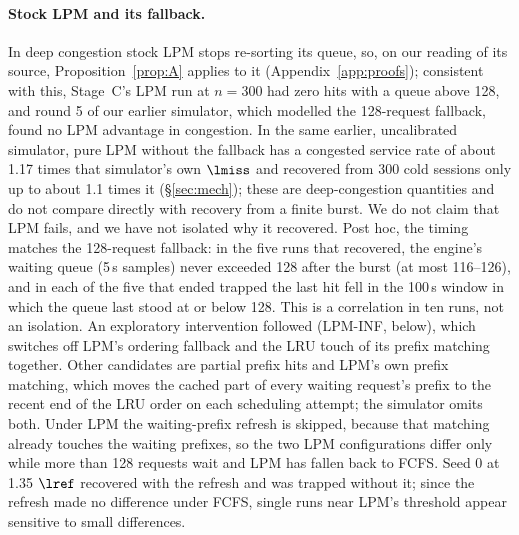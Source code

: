 \paragraph{Stock LPM and its fallback.} In deep congestion stock LPM stops re-sorting its queue, so, on our reading of its source, Proposition~\ref{prop:A} applies to it (Appendix~\ref{app:proofs}); consistent with this, Stage~C's LPM run at $n=300$ had zero hits with a queue above 128, and round 5 of our earlier simulator, which modelled the 128-request fallback, found no LPM advantage in congestion. In the same earlier, uncalibrated simulator, pure LPM without the fallback has a congested service rate of about 1.17 times that simulator's own $\lmiss$ and recovered from 300 cold sessions only up to about 1.1 times it (\S\ref{sec:mech}); these are deep-congestion quantities and do not compare directly with recovery from a finite burst. We do not claim that LPM fails, and we have not isolated why it recovered. Post hoc, the timing matches the 128-request fallback: in the five runs that recovered, the engine's waiting queue (5\,s samples) never exceeded 128 after the burst (at most 116--126), and in each of the five that ended trapped the last hit fell in the 100\,s window in which the queue last stood at or below 128. This is a correlation in ten runs, not an isolation. An exploratory intervention followed (LPM-INF, below), which switches off LPM's ordering fallback and the LRU touch of its prefix matching together. Other candidates are partial prefix hits and LPM's own prefix matching, which moves the cached part of every waiting request's prefix to the recent end of the LRU order on each scheduling attempt; the simulator omits both. Under LPM the waiting-prefix refresh is skipped, because that matching already touches the waiting prefixes, so the two LPM configurations differ only while more than 128 requests wait and LPM has fallen back to FCFS. Seed 0 at 1.35 $\lref$ recovered with the refresh and was trapped without it; since the refresh made no difference under FCFS, single runs near LPM's threshold appear sensitive to small differences.


